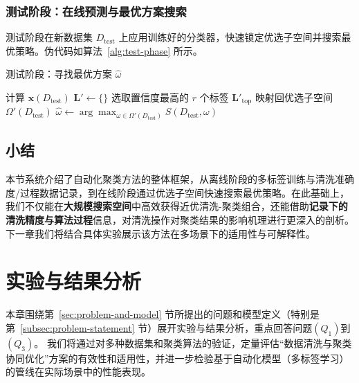 \documentclass[10pt]{article} %
\numberwithin{equation}{section}
\begin{document}
\subsubsection{测试阶段：在线预测与最优方案搜索}
测试阶段在新数据集 \(D_{\text{test}}\) 上应用训练好的分类器，快速锁定优选子空间并搜索最优策略。伪代码如算法~\ref{alg:test-phase} 所示。

\begin{algorithm}[H]
\caption{测试阶段：寻找最优方案 \(\hat{\omega}\)}
\label{alg:test-phase}

计算 $\mathbf{x}(D_{\text{test}})$\;
$\mathbf{L}' \leftarrow \{\}$\;
选取置信度最高的 $r$ 个标签 $\mathbf{L}'_{\mathrm{top}}$\;
映射回优选子空间 $\Omega'(D_{\text{test}})$\;
$\hat{\omega} \leftarrow \arg\max_{\omega \in \Omega'(D_{\text{test}})}S(D_{\text{test}}, \omega)$\;
\KwRet{$\hat{\omega}$}
\end{algorithm}

\subsection{小结}
本节系统介绍了自动化聚类方法的整体框架，从离线阶段的多标签训练与清洗准确度/过程数据记录，到在线阶段通过优选子空间快速搜索最优策略。在此基础上，我们不仅能在\textbf{大规模搜索空间}中高效获得近优清洗-聚类组合，还能借助\textbf{记录下的清洗精度与算法过程}信息，对清洗操作对聚类结果的影响机理进行更深入的剖析。下一章我们将结合具体实验展示该方法在多场景下的适用性与可解释性。



\section{实验与结果分析}
\label{sec:chapter5}

本章围绕第~\ref{sec:problem-and-model} 节所提出的问题和模型定义（特别是第~\ref{subsec:problem-statement} 节）展开实验与结果分析，重点回答问题\((Q_1)\)到\((Q_3)\)。
我们将通过对多种数据集和聚类算法的验证，定量评估“数据清洗与聚类协同优化”方案的有效性和适用性，并进一步检验基于自动化模型（多标签学习）的管线在实际场景中的性能表现。
\end{document}
